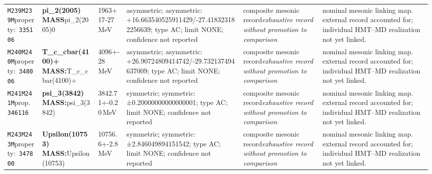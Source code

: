 \begin{landscape}
\begin{longtable}{L{1.85cm}L{4.45cm}L{2.35cm}L{4.05cm}L{3.35cm}L{7.15cm}}
\texttt{M239}\newline \texttt{M239M}\newline property:\ \texttt{335106} & \textbf{pi\_\allowbreak{}2(2005) MASS}\newline pi\_\allowbreak{}2(2005)0 & 1963+17-27\,MeV & asymmetric; asymmetric: +16.663540525911429/-27.418323182256639; type AC; limit NONE; confidence not reported & composite mesonic record\newline \emph{exhaustive record without promotion to comparison} & nominal mesonic linking map. external record accounted for; individual HMT--MD realization not yet linked. \\
\texttt{M240}\newline \texttt{M240M}\newline property:\ \texttt{348006} & \textbf{T\_\allowbreak{}c\_\allowbreak{}cbar(4100)+ MASS:}\newline T\_\allowbreak{}c\_\allowbreak{}cbar(4100)+ & 4096+-28\,MeV & asymmetric; asymmetric: +26.90724809414742/-29.732137494637009; type AC; limit NONE; confidence not reported & composite mesonic record\newline \emph{exhaustive record without promotion to comparison} & nominal mesonic linking map. external record accounted for; individual HMT--MD realization not yet linked. \\
\texttt{M241}\newline \texttt{M241M}\newline prop.\ \texttt{346116} & \textbf{psi\_\allowbreak{}3(3842) MASS:}\newline psi\_\allowbreak{}3(3842) & 3842.71+-0.20\,MeV & symmetric; symmetric: ±0.20000000000000001; type AC; limit NONE; confidence not reported & composite mesonic record\newline \emph{exhaustive record without promotion to comparison} & nominal mesonic linking map. external record accounted for; individual HMT--MD realization not yet linked. \\
\texttt{M243}\newline \texttt{M243M}\newline property:\ \texttt{347800} & \textbf{Upsilon(10753) MASS:}\newline Upsilon(10753) & 10756.6+-2.8\,MeV & symmetric; symmetric: ±2.846049894151542; type AC; limit NONE; confidence not reported & composite mesonic record\newline \emph{exhaustive record without promotion to comparison} & nominal mesonic linking map. external record accounted for; individual HMT--MD realization not yet linked. \\

\end{longtable}
\end{landscape}
